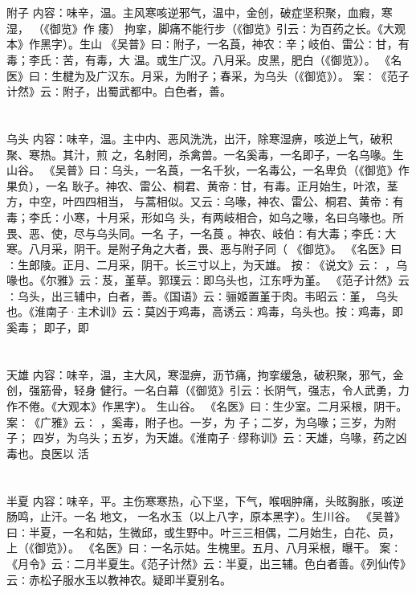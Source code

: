 \documentclass[12pt,UTF8]{ctexbook}
\begin{document}
\section{}附子
内容：味辛，温。主风寒咳逆邪气，温中，金创，破症坚积聚，血瘕，寒湿， （《御览》作 
痿） 拘挛，脚痛不能行步（《御览》引云∶为百药之长。《大观本》作黑字）。生山 
《吴普》曰∶附子，一名莨，神农∶辛；岐伯、雷公∶甘，有毒；李氏∶苦，有毒，大 
温。或生广汉。八月采。皮黑，肥白（《御览》）。 
《名医》曰∶生楗为及广汉东。月采，为附子；春采，为乌头（《御览》）。 
案∶《范子计然》云∶附子，出蜀武都中。白色者，善。 


\section{}乌头
内容：味辛，温。主中内、恶风洗洗，出汗，除寒湿痹，咳逆上气，破积聚、寒热。其汁，煎 
之，名射罔，杀禽兽。一名奚毒，一名即子，一名乌喙。生山谷。 
《吴普》曰∶乌头，一名莨，一名千狄，一名毒公，一名卑负（《御览》作果负），一名 
耿子。神农、雷公、桐君、黄帝∶甘，有毒。正月始生，叶浓，茎方，中空，叶四四相当， 
与蒿相似。又云∶乌喙，神农、雷公、桐君、黄帝∶有毒；李氏∶小寒，十月采，形如乌 
头，有两岐相合，如乌之喙，名曰乌喙也。所畏、恶、使，尽与乌头同。一名 子，一名莨 
。神农、岐伯∶有大毒；李氏∶大寒。八月采，阴干。是附子角之大者，畏、恶与附子同（ 
《御览》。 
《名医》曰∶生郎陵。正月、二月采，阴干。长三寸以上，为天雄。 
按∶《说文》云∶ ，乌喙也。《尔雅》云∶芨，堇草。郭璞云∶即乌头也，江东呼为堇。 
《范子计然》云∶乌头，出三辅中，白者，善。《国语》云∶骊姬置堇于肉。韦昭云∶堇， 
乌头也。《淮南子·主术训》云∶莫凶于鸡毒，高诱云∶鸡毒，乌头也。按∶鸡毒，即奚毒； 
即子，即 


\section{}天雄
内容：味辛，温，主大风，寒湿痹，沥节痛，拘挛缓急，破积聚，邪气，金创，强筋骨，轻身 
健行。一名白幕（《御览》引云∶长阴气，强志，令人武勇，力作不倦。《大观本》作黑字）。 
生山谷。 
《名医》曰∶生少室。二月采根，阴干。 
案∶《广雅》云∶ ，奚毒，附子也。一岁，为 子；二岁，为乌喙；三岁，为附子； 
四岁，为乌头；五岁，为天雄。《淮南子·缪称训》云∶天雄，乌喙，药之凶毒也。良医以 
活 


\section{}半夏
内容：味辛，平。主伤寒寒热，心下坚，下气，喉咽肿痛，头眩胸胀，咳逆肠鸣，止汗。一名 
地文， 
一名水玉（以上八字，原本黑字）。生川谷。 
《吴普》曰∶半夏，一名和姑，生微邱，或生野中。叶三三相偶，二月始生，白花、员， 
上（《御览》）。 
《名医》曰∶一名示姑。生槐里。五月、八月采根，曝干。 
案∶《月令》云∶二月半夏生。《范子计然》云∶半夏，出三辅。色白者善。《列仙传》 
云∶赤松子服水玉以教神农。疑即半夏别名。 
\end{document}
